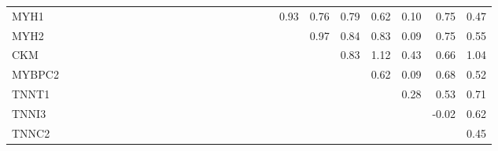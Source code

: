 \begin{longtable}{lrrrrrrrrrrrrrrrrrrrrrrrrrr}
MYH1    &             &             &             &           &             &               &            &             &             &              &            &             &              &            &            &            &             &              &            &       0.93 &      0.76 &         0.79 &        0.62 &        0.10 &        0.75 &     0.47 \\
MYH2    &             &             &             &           &             &               &            &             &             &              &            &             &              &            &            &            &             &              &            &            &      0.97 &         0.84 &        0.83 &        0.09 &        0.75 &     0.55 \\
CKM     &             &             &             &           &             &               &            &             &             &              &            &             &              &            &            &            &             &              &            &            &           &         0.83 &        1.12 &        0.43 &        0.66 &     1.04 \\
MYBPC2  &             &             &             &           &             &               &            &             &             &              &            &             &              &            &            &            &             &              &            &            &           &              &        0.62 &        0.09 &        0.68 &     0.52 \\
TNNT1   &             &             &             &           &             &               &            &             &             &              &            &             &              &            &            &            &             &              &            &            &           &              &             &        0.28 &        0.53 &     0.71 \\
TNNI3   &             &             &             &           &             &               &            &             &             &              &            &             &              &            &            &            &             &              &            &            &           &              &             &             &       -0.02 &     0.62 \\
TNNC2   &             &             &             &           &             &               &            &             &             &              &            &             &              &            &            &            &             &              &            &            &           &              &             &             &             &     0.45 \\
\end{longtable}


